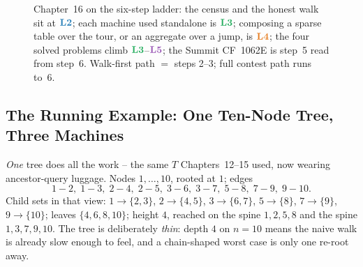\begin{figure}[H]
\centering
{}
\caption*{Chapter~16 on the six-step ladder: the census and the honest walk
sit at \(\lv2\); each machine used standalone is \(\lv3\); composing a
sparse table over the tour, or an aggregate over a jump, is \(\lv4\); the
four solved problems climb \(\lv3\)--\(\lv5\); the Summit CF~1062E is step~5
read from step~6.  Walk-first path \(=\) steps 2--3; full contest path runs
to~6.}
\end{figure}

\subsection*{The Running Example: One Ten-Node Tree, Three Machines}

\emph{One} tree does all the work -- the same \(T\) Chapters~12--15 used,
now wearing ancestor-query luggage.  Nodes \(1,\dots,10\), rooted at \(1\);
edges
\[
  1\!-\!2,\; 1\!-\!3,\; 2\!-\!4,\; 2\!-\!5,\; 3\!-\!6,\; 3\!-\!7,\; 5\!-\!8,\; 7\!-\!9,\; 9\!-\!10 .
\]
Child sets in that view: \(1\!\to\!\{2,3\}\), \(2\!\to\!\{4,5\}\),
\(3\!\to\!\{6,7\}\), \(5\!\to\!\{8\}\), \(7\!\to\!\{9\}\), \(9\!\to\!\{10\}\);
leaves \(\{4,6,8,10\}\); height \(4\), reached on the spine
\(1,2,5,8\) and the spine \(1,3,7,9,10\).  The tree is deliberately
\emph{thin}: depth \(4\) on \(n=10\) means the naive walk is already slow
enough to feel, and a chain-shaped worst case is only one re-root away.

